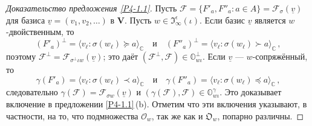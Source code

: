 \documentclass{amsart}
\theoremstyle{definition}
\newcommand{\bs}[1]{\boldsymbol{#1}}
\begin{document}
\begin{proof}[Доказательство предложения \ref{P4-1.1}]
Пусть $\mathcal{F}=\{F'_a,F''_a:a\in A\}=\mathcal{F}_\sigma(\underline{v})$ для базиса $\underline{v}=(v_1,v_2,\ldots)$ в $\mathbf{V}$.
Пусть $w\in\mathfrak{I}_\infty^\epsilon(\iota)$.
Если базис $\underline{v}$ является $w$-двойственным,  то
\[
(F'_a)^\perp=\langle v_\ell:\sigma(w_\ell)\succeq a\rangle_\mathbb{C}
\quad\mbox{и}\quad
(F''_a)^\perp=\langle v_\ell:\sigma(w_\ell)\succ a\rangle_\mathbb{C}\,,
\]
поэтому $\mathcal{F}^\perp=\mathcal{F}_{\sigma^\perp\iota w}(\underline{v})$;
это даёт
$(\mathcal{F}^\perp,\mathcal{F})\in\pmb{\mathbb{O}}^\perp_{w\iota}$.
Если $\underline{v}$ --- $w$-сопряжённый, то
\[
\gamma(F'_a)=\langle v_\ell:\sigma(w_\ell)\prec a\rangle_\mathbb{C}
\quad\mbox{и}\quad
\gamma(F''_a)=\langle v_\ell:\sigma(w_\ell)\preceq a\rangle_\mathbb{C}\,,
\]
следовательно $\gamma(\mathcal{F})=\mathcal{F}_{\sigma w}(\underline{v})$
и
$(\gamma(\mathcal{F}),\mathcal{F})\in\pmb{\mathbb{O}}^\gamma_{w\iota}$.
Это доказывает включение в предложении \ref{P4-1.1}\,{\rm (b)}.
Отметим что эти включения указывают, в частности,  на то, что подмножества $\bs{\mathcal{O}}_w$, так же как и $\bs{\mathfrak{O}}_w$, попарно различны.


\end{proof}
\end{document}
